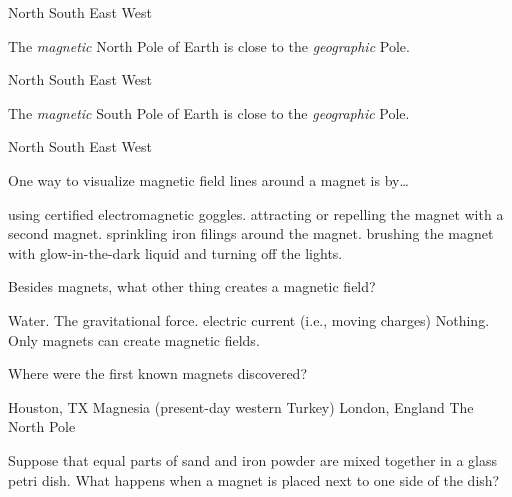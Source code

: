 \documentclass[]{exam}
\begin{document}
\begin{questions}
\begin{randomizechoices}
\CorrectChoice North
\choice South
\choice East
\choice West
\end{randomizechoices}

\question
The \textit{magnetic} North Pole of Earth is close to the \textit{geographic} \fillin Pole.

\begin{randomizechoices}
\choice North
\CorrectChoice South
\choice East
\choice West
\end{randomizechoices}

\question
The \textit{magnetic} South Pole of Earth is close to the \textit{geographic} \fillin Pole.

\begin{randomizechoices}
\CorrectChoice North
\choice South
\choice East
\choice West
\end{randomizechoices}

\question
One way to visualize magnetic field lines around a magnet is by\ldots 

\begin{randomizechoices}
\choice using certified electromagnetic goggles.
\choice attracting or repelling the magnet with a second magnet.
\CorrectChoice sprinkling iron filings around the magnet.
\choice brushing the magnet with glow-in-the-dark liquid and turning off the lights.
\end{randomizechoices}

\question
Besides magnets, what other thing creates a magnetic field?

\begin{randomizechoices}[norandomize]
\choice Water.
\choice The gravitational force.
\CorrectChoice electric current (i.e., moving charges)
\choice Nothing. Only magnets can create magnetic fields.
\end{randomizechoices}

\clearpage

\question
Where were the first known magnets discovered?

\begin{randomizechoices}
\choice Houston, TX
\CorrectChoice Magnesia (present-day western Turkey)
\choice London, England
\choice The North Pole
\end{randomizechoices}

\question
Suppose that equal parts of sand and iron powder are mixed together in a glass petri dish. What happens when a magnet is placed next to one side of the dish?


\end{questions}
\end{document}
